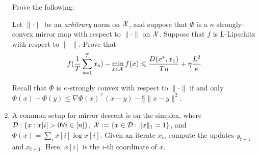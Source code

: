 \documentclass[12pt]{article}
\begin{document}
\begin{enumerate}
Prove the following:
\begin{theorem*} Let $\|\cdot\|$ be an \emph{arbitrary} norm on ${\cal X}$, and suppose that $\Phi$ is a $\kappa$ strongly-convex mirror map with respect to $\|\cdot\|$ on ${\cal X}$. Suppose that $f$ is L-Lipschitz with respect to $\|\cdot\|$. Prove that 
\begin{eqnarray}
f(\frac{1}{T}\sum_{s=1}^T x_s) - \min_{x \in {\cal X}} f(x) \leqslant \frac{D(x^*,x_1)}{T\eta} + \eta \frac{L^2 }{\kappa}
\end{eqnarray}
\end{theorem*}
Recall that $\Phi$ is $\kappa$-strongly convex with respect to $\|\cdot\|$ if and only $\Phi(x)  - \Phi(y) \le \nabla \Phi(x)^\top (x-y) - \frac{\kappa}{2}\|x-y\|^2$. 
\item
A common setup for mirror descent is on the simplex, where ${\cal D}: \{x: x[i] > 0 \forall i \in [n]\}$, ${\cal X} := \{x \in {\cal D}:\|x\|_1 = 1\}$, and $\Phi(x) = \sum_i x[i] \log x[i]$. Given an iterate $x_t$, compute the updates $y_{t+1}$ and $x_{t+1}$. Here, $x[i]$ is the $i$-th coordinate of $x$.
\end{enumerate}
\newpage
\end{document}
